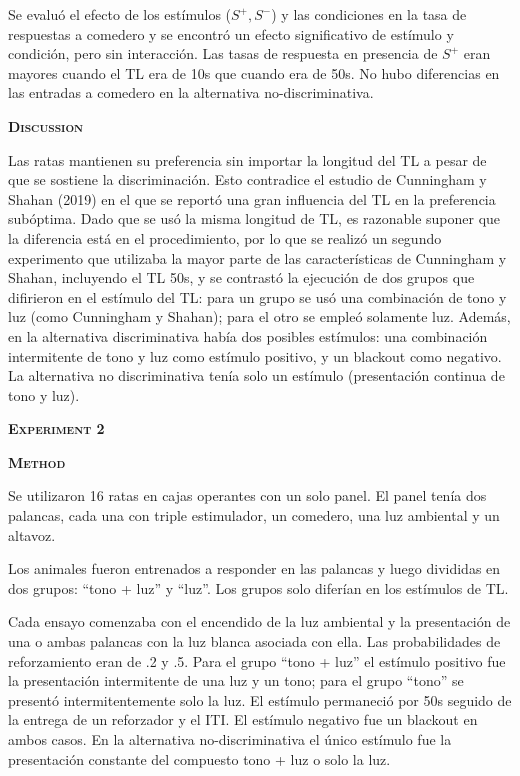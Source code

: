 \documentclass[a4paper,12pt]{article}
\begin{document}
Se evaluó el efecto de los estímulos ($S^{+}, S^{-}$) y las condiciones en la tasa de respuestas a comedero y se encontró un efecto significativo de estímulo y condición, pero sin interacción. Las tasas de respuesta en presencia de $S^{+}$ eran mayores cuando el TL era de 10s que cuando era de 50s. No hubo diferencias en las entradas a comedero en la alternativa no-discriminativa.

{\scshape\bfseries Discussion}

Las ratas mantienen su preferencia sin importar la longitud del TL a pesar de que se sostiene la discriminación. Esto contradice el estudio de Cunningham y Shahan (2019) en el que se reportó una gran influencia del TL en la preferencia subóptima. Dado que se usó la misma longitud de TL, es razonable suponer que la diferencia está en el procedimiento, por lo que se realizó un segundo experimento que utilizaba la mayor parte de las características de Cunningham y Shahan, incluyendo el TL 50s, y se contrastó la ejecución de dos grupos que difirieron en el estímulo del TL: para un grupo se usó una combinación de tono y luz (como Cunningham y Shahan); para el otro se empleó solamente luz. Además, en la alternativa discriminativa había dos posibles estímulos: una combinación intermitente de tono y luz como estímulo positivo, y un blackout como negativo. La alternativa no discriminativa tenía solo un estímulo (presentación continua de tono y luz).

{\scshape\bfseries Experiment 2}

{\scshape\bfseries Method}

Se utilizaron 16 ratas en cajas operantes con un solo panel. El panel tenía dos palancas, cada una con triple estimulador, un comedero, una luz ambiental y un altavoz.

Los animales fueron entrenados a responder en las palancas y luego divididas en dos grupos: ``tono + luz'' y ``luz''. Los grupos solo diferían en los estímulos de TL. 

Cada ensayo comenzaba con el encendido de la luz ambiental y la presentación de una o ambas palancas con la luz blanca asociada con ella. 
 Las probabilidades de reforzamiento eran de .2 y .5. Para el grupo ``tono + luz'' el estímulo positivo fue la presentación intermitente de una luz y un tono; para el grupo ``tono'' se presentó intermitentemente solo la luz. El estímulo permaneció por 50s seguido de la entrega de un reforzador y el ITI. El estímulo negativo fue un blackout en ambos casos. En la alternativa no-discriminativa el único estímulo fue la presentación constante del compuesto tono + luz o solo la luz.
\end{document}
